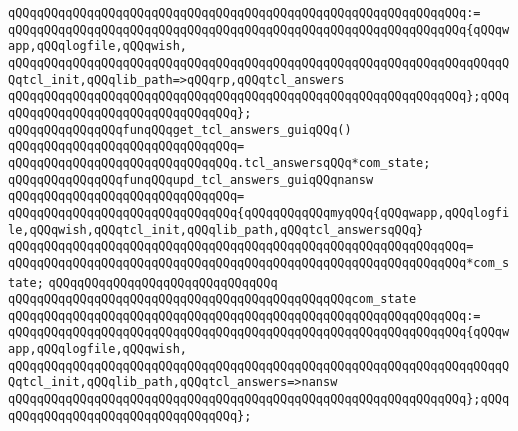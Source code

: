 \verb|qQQqqQQqqQQqqQQqqQQqqQQqqQQqqQQqqQQqqQQqqQQqqQQqqQQqqQQqqQQqqQQq:=|\newline
\verb|qQQqqQQqqQQqqQQqqQQqqQQqqQQqqQQqqQQqqQQqqQQqqQQqqQQqqQQqqQQqqQQq{qQQqwapp,qQQqlogfile,qQQqwish,|\newline
\verb|qQQqqQQqqQQqqQQqqQQqqQQqqQQqqQQqqQQqqQQqqQQqqQQqqQQqqQQqqQQqqQQqqQQqqQQqtcl_init,qQQqlib_path=>qQQqrp,qQQqtcl_answers|\newline
\verb|qQQqqQQqqQQqqQQqqQQqqQQqqQQqqQQqqQQqqQQqqQQqqQQqqQQqqQQqqQQqqQQq};qQQq|\newline
\verb|qQQqqQQqqQQqqQQqqQQqqQQqqQQqqQQq};|\newline
\newline
\verb|qQQqqQQqqQQqqQQqfunqQQqget_tcl_answers_guiqQQq()|\newline
\verb|qQQqqQQqqQQqqQQqqQQqqQQqqQQqqQQq=|\newline
\verb|qQQqqQQqqQQqqQQqqQQqqQQqqQQqqQQq.tcl_answersqQQq*com_state;|\newline
\newline
\verb|qQQqqQQqqQQqqQQqfunqQQqupd_tcl_answers_guiqQQqnansw|\newline
\verb|qQQqqQQqqQQqqQQqqQQqqQQqqQQqqQQq=|\newline
\verb|qQQqqQQqqQQqqQQqqQQqqQQqqQQqqQQq{qQQqqQQqqQQqmyqQQq{qQQqwapp,qQQqlogfile,qQQqwish,qQQqtcl_init,qQQqlib_path,qQQqtcl_answersqQQq}|\newline
\verb|qQQqqQQqqQQqqQQqqQQqqQQqqQQqqQQqqQQqqQQqqQQqqQQqqQQqqQQqqQQqqQQq=|\newline
\verb|qQQqqQQqqQQqqQQqqQQqqQQqqQQqqQQqqQQqqQQqqQQqqQQqqQQqqQQqqQQqqQQq*com_state;|\newline
\verb|qQQqqQQqqQQqqQQqqQQqqQQqqQQqqQQq|\newline
\verb|qQQqqQQqqQQqqQQqqQQqqQQqqQQqqQQqqQQqqQQqqQQqqQQqcom_state|\newline
\verb|qQQqqQQqqQQqqQQqqQQqqQQqqQQqqQQqqQQqqQQqqQQqqQQqqQQqqQQqqQQqqQQq:=|\newline
\verb|qQQqqQQqqQQqqQQqqQQqqQQqqQQqqQQqqQQqqQQqqQQqqQQqqQQqqQQqqQQqqQQq{qQQqwapp,qQQqlogfile,qQQqwish,|\newline
\verb|qQQqqQQqqQQqqQQqqQQqqQQqqQQqqQQqqQQqqQQqqQQqqQQqqQQqqQQqqQQqqQQqqQQqqQQqtcl_init,qQQqlib_path,qQQqtcl_answers=>nansw|\newline
\verb|qQQqqQQqqQQqqQQqqQQqqQQqqQQqqQQqqQQqqQQqqQQqqQQqqQQqqQQqqQQqqQQq};qQQq|\newline
\verb|qQQqqQQqqQQqqQQqqQQqqQQqqQQqqQQq};|\newline
\newline
